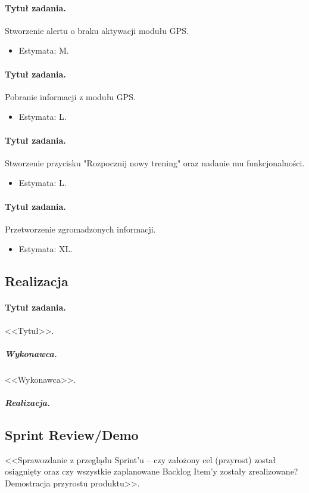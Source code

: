 \documentclass[a4paper]{article}
\begin{document}
\paragraph{Tytuł zadania.} Stworzenie alertu o braku aktywacji modułu GPS.
\begin{itemize}
\item Estymata: M.
\end{itemize}

\paragraph{Tytuł zadania.} Pobranie informacji z modułu GPS.
\begin{itemize}
\item Estymata: L.
\end{itemize}

\paragraph{Tytuł zadania.} Stworzenie przycisku "Rozpocznij nowy trening" oraz nadanie mu funkcjonalności.
\begin{itemize}
\item Estymata: L.
\end{itemize}

\paragraph{Tytuł zadania.} Przetworzenie zgromadzonych informacji.
\begin{itemize}
\item Estymata: XL.
\end{itemize}

\subsection{Realizacja}

\paragraph{Tytuł zadania.} <<Tytuł>>.
\subparagraph{Wykonawca.} <<Wykonawca>>.
\subparagraph{Realizacja.}

\subsection{Sprint Review/Demo}
<<Sprawozdanie z przeglądu Sprint'u -- czy założony cel (przyrost) został osiągnięty oraz czy wszystkie zaplanowane Backlog Item'y zostały zrealizowane? Demostracja przyrostu produktu>>.
\end{document}
